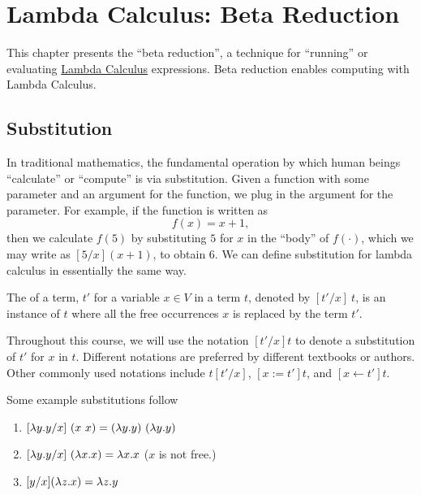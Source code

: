 \chapter{Lambda Calculus: Beta Reduction}
\label{ch:lambda}

\begin{preamble}
This chapter presents the ``beta reduction'', a technique for ``running'' or evaluating \href{ch:lcs}{Lambda Calculus} expressions.
%
Beta reduction enables computing with Lambda Calculus.
\end{preamble}

\section{Substitution}
\label{sec:lcsb::sub}

In traditional mathematics, the fundamental operation by which human beings ``calculate'' or ``compute'' is via substitution.
%
Given a function with some parameter and an argument for the function, we plug in the argument for the parameter.
%
For example, if the function is written as 
\[
f(x) = x + 1,
\]  
then we calculate $f(5)$ by substituting $5$ for $x$ in the ``body'' of $f(\cdot)$, which we may write as $[5/x](x+1)$, to obtain $6$.
%
We can define substitution for lambda calculus in essentially the same
way.

\begin{definition}[Substitution]
\label{def:lcsb::basic}
The  of a term, $t'$ for a variable $x \in V$ in a term
$t$, denoted by $[t'/x]~t$, is an instance of $t$ where all the free
occurrences $x$ is replaced by the term $t'$.
\end{definition}

Throughout this course, we will use the notation $[t'/x]t$ to denote a
substitution of $t'$ for $x$ in $t$.  Different notations are
preferred by different textbooks or authors. Other commonly used
notations include $t[t'/x]$, $[x:=t']t$, and  $[x \leftarrow t']t$.  

\begin{example}
\label{xmpl:lcsb::basic}
Some example substitutions follow
\begin{enumerate}
\item $[\lambda y.y/x]~(x~x)= (\lambda y.y)~(\lambda y.y)$

\item $[\lambda y.y/x]~(\lambda x.x) = \lambda x.x$ ($x$ is not free.)

\item $[y/x](\lambda z.x) = \lambda z.y$

\end{enumerate}
\end{example}

